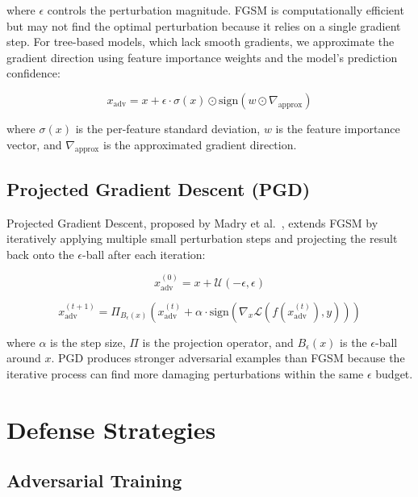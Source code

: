 \documentclass[12pt,a4paper,oneside]{report}
\begin{document}
\noindent where $\epsilon$ controls the perturbation magnitude. FGSM is computationally efficient but may not find the optimal perturbation because it relies on a single gradient step. For tree-based models, which lack smooth gradients, we approximate the gradient direction using feature importance weights and the model's prediction confidence:

\begin{equation}
    \label{eq:fgsm_tree}
    x_{\text{adv}} = x + \epsilon \cdot \sigma(x) \odot \text{sign}(w \odot \nabla_{\text{approx}})
\end{equation}

\noindent where $\sigma(x)$ is the per-feature standard deviation, $w$ is the feature importance vector, and $\nabla_{\text{approx}}$ is the approximated gradient direction.

\subsection{Projected Gradient Descent (PGD)}

Projected Gradient Descent, proposed by Madry et al.~\cite{madry2018towards}, extends FGSM by iteratively applying multiple small perturbation steps and projecting the result back onto the $\epsilon$-ball after each iteration:

\begin{equation}
    \label{eq:pgd_init}
    x_{\text{adv}}^{(0)} = x + \mathcal{U}(-\epsilon, \epsilon)
\end{equation}

\begin{equation}
    \label{eq:pgd_step}
    x_{\text{adv}}^{(t+1)} = \Pi_{B_\epsilon(x)}\left(x_{\text{adv}}^{(t)} + \alpha \cdot \text{sign}\left(\nabla_x \mathcal{L}\left(f(x_{\text{adv}}^{(t)}), y\right)\right)\right)
\end{equation}

\noindent where $\alpha$ is the step size, $\Pi$ is the projection operator, and $B_\epsilon(x)$ is the $\epsilon$-ball around $x$. PGD produces stronger adversarial examples than FGSM because the iterative process can find more damaging perturbations within the same $\epsilon$ budget.

\section{Defense Strategies}

\subsection{Adversarial Training}
\end{document}
